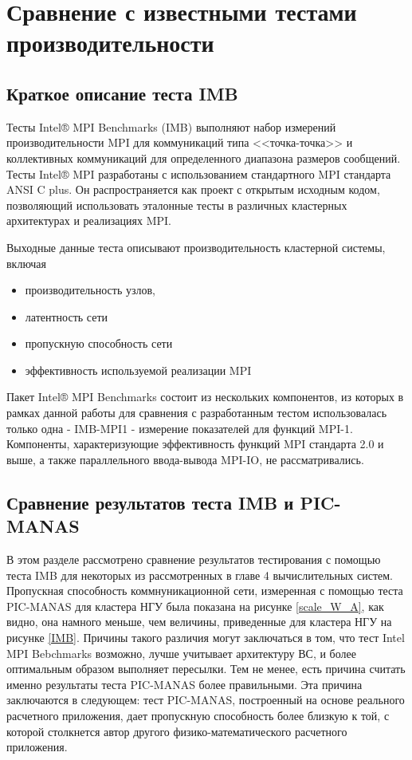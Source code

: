 \section{Сравнение с известными тестами производительности}

\subsection{Краткое описание теста IMB}

Тесты Intel® MPI Benchmarks (IMB) \cite{IMB} выполняют набор измерений производительности MPI для коммуникаций типа <<точка-точка>> и коллективных коммуникаций для определенного диапазона размеров сообщений. Тесты Intel® MPI разработаны с использованием стандартного MPI стандарта ANSI C plus. Он распространяется как проект с открытым исходным кодом, позволяющий использовать эталонные тесты в различных кластерных архитектурах и реализациях MPI.

Выходные данные теста описывают производительность кластерной системы, включая 
\begin{itemize}
	\item производительность узлов, 
	\item латентность сети  
	\item пропускную способность сети
	\item эффективность используемой реализации MPI
\end{itemize}

Пакет Intel® MPI Benchmarks состоит из нескольких компонентов, из которых в рамках данной работы для сравнения с разработанным тестом использовалась только одна - IMB-MPI1 - измерение показателей для функций MPI-1. Компоненты, характеризующие эффективность функций MPI стандарта 2.0 и выше, а также параллельного ввода-вывода MPI-IO, не рассматривались.

\subsection{Сравнение результатов теста IMB и PIC-MANAS} 

В этом разделе рассмотрено сравнение результатов тестирования с помощью теста IMB для некоторых из рассмотренных в главе 4 вычислительных систем. Пропускная способность коммнуникационной сети, измеренная с помощью теста PIC-MANAS для кластера НГУ была показана на рисунке \ref{scale_W_A}, как видно, она намного меньше, чем величины, приведенные для кластера НГУ на рисунке \ref{IMB}.
Причины такого различия могут заключаться в том, что тест Intel MPI Bebchmarks  возможно, лучше учитывает архитектуру ВС, и более оптимальным образом выполняет пересылки. Тем не менее, есть причина считать именно результаты теста PIC-MANAS более правильными. Эта причина заключаются в следующем: тест PIC-MANAS, построенный на основе реального расчетного приложения, дает пропускную способность более близкую к той, с которой столкнется автор другого физико-математического расчетного приложения.  


